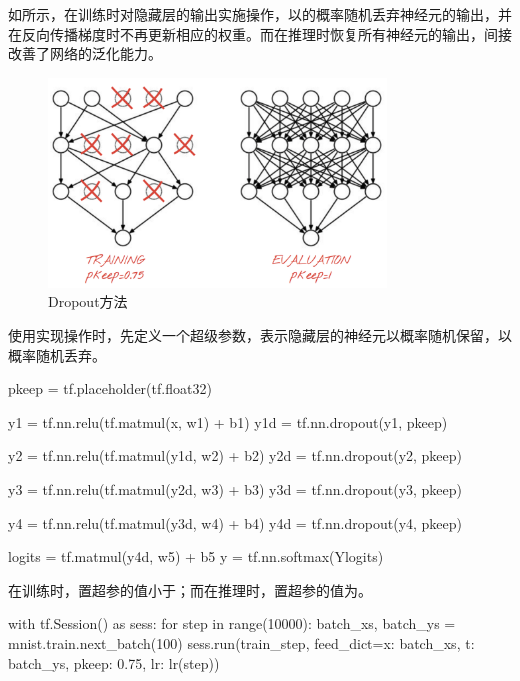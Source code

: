 \begin{content}
如所示，在训练时对隐藏层的输出实施操作，以的概率随机丢弃神经元的输出，并在反向传播梯度时不再更新相应的权重。而在推理时恢复所有神经元的输出，间接改善了网络的泛化能力。

\begin{figure}[H]
\centering
\includegraphics[width=0.8\textwidth]{figures/mnist-dropout.png}
\caption{Dropout方法}
 \label{fig:mnist-dropout}
\end{figure}

使用\tf{}实现操作时，先定义一个超级参数，表示隐藏层的神经元以概率随机保留，以概率随机丢弃。

\begin{leftbar}
\begin{python}
pkeep = tf.placeholder(tf.float32)

y1 = tf.nn.relu(tf.matmul(x,  w1) + b1)
y1d = tf.nn.dropout(y1, pkeep)

y2 = tf.nn.relu(tf.matmul(y1d, w2) + b2)
y2d = tf.nn.dropout(y2, pkeep)

y3 = tf.nn.relu(tf.matmul(y2d, w3) + b3)
y3d = tf.nn.dropout(y3, pkeep)

y4 = tf.nn.relu(tf.matmul(y3d, w4) + b4)
y4d = tf.nn.dropout(y4, pkeep)

logits = tf.matmul(y4d, w5) + b5
y = tf.nn.softmax(Ylogits)
\end{python}
\end{leftbar}

在训练时，置超参的值小于；而在推理时，置超参的值为。

\begin{leftbar}
\begin{python}
with tf.Session() as sess:
  for step in range(10000):
    batch_xs, batch_ys = mnist.train.next_batch(100)
    sess.run(train_step, 
      feed_dict={x: batch_xs, t: batch_ys, pkeep: 0.75, lr: lr(step)})


\end{python}
\end{leftbar}
\end{content}
